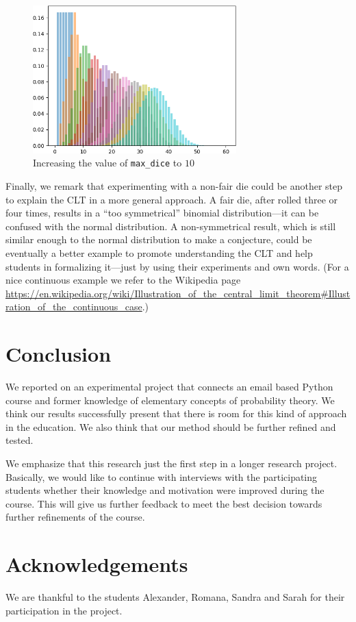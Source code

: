 \documentclass[]{interact}
\theoremstyle{plain}%
\theoremstyle{definition}
\theoremstyle{remark}
\begin{document}
\begin{figure}
\begin{center}
\includegraphics[width=0.7\textwidth]{10}
\caption{Increasing the value of \texttt{max\_dice} to $10$}
\label{10}
\end{center}
\end{figure}

Finally, we remark that experimenting with a non-fair die could be another step to explain
the CLT in a more general approach. A fair die, after rolled three or four times,
results in a ``too symmetrical'' binomial distribution---it can be confused with
the normal distribution. A non-symmetrical result, which is still similar enough
to the normal distribution to make a conjecture, could be eventually a better
example to promote understanding the CLT and help students in formalizing it---just
by using their experiments and own words.
(For a nice continuous example we refer to the Wikipedia page
\url{https://en.wikipedia.org/wiki/Illustration_of_the_central_limit_theorem#Illustration_of_the_continuous_case}.)

\section{Conclusion}

We reported on an experimental project that connects an email based Python course
and former knowledge of elementary concepts of probability theory.
We think our results successfully present that there is room for this kind of approach
in the education. We also think that our method should be further refined and tested.

We emphasize that this research just the first step in a longer research project.
Basically, we would like to continue with interviews with the participating
students whether their knowledge and motivation were improved during the course.
This will give us further feedback to meet the best decision towards further
refinements of the course.

\section*{Acknowledgements}

We are thankful to the students Alexander, Romana, Sandra and Sarah
for their participation in the project.




\end{document}
